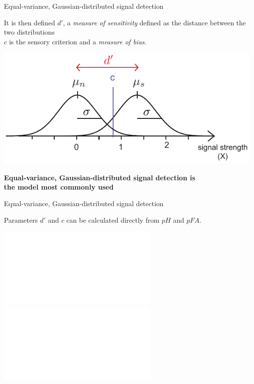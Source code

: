 \documentclass[10pt]{beamer}
\begin{document}
\begin{frame}{Equal-variance, Gaussian-distributed signal detection}
\begin{block}{It is then defined}
$d'$, a \textit{measure of sensitivity} defined as the distance between the two distributions\\
$c$ is the sensory criterion and a \textit{measure of bias}.
\end{block}


\begin{center}
\includegraphics[scale=1]{figs/evgsdt.pdf}
\end{center}

\begin{center}
\vspace{20pt}
\textbf{Equal-variance, Gaussian-distributed signal detection is\\
the model most commonly used}
\end{center}
\end{frame}


\begin{frame}{Equal-variance, Gaussian-distributed signal detection}

Parameters $d'$ and $c$ can be calculated directly from
$pH$ and $pFA$.\\

\begin{center}
\includegraphics<2->[scale=0.8]{figs/areas.pdf}
\includegraphics<1>[scale=0.8]{figs/areas2.pdf}
\end{center}


\end{frame}
\end{document}
